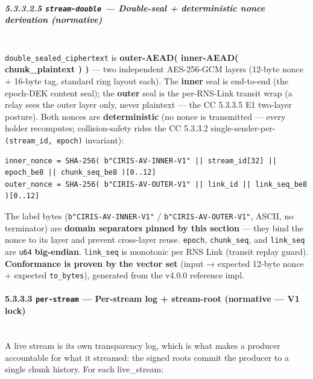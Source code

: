 \documentclass[11pt]{article}
\begin{document}
\subparagraph{5.3.3.2.5 \texttt{stream-double} — Double-seal + deterministic nonce derivation (normative)}\mbox{}\\


\texttt{double\_sealed\_ciphertext} is \textbf{outer-AEAD( inner-AEAD( chunk\_plaintext ) )} — two independent AES-256-GCM layers (12-byte nonce + 16-byte tag, standard ring layout each). The \textbf{inner} seal is end-to-end (the epoch-DEK content seal); the \textbf{outer} seal is the per-RNS-Link transit wrap (a relay sees the outer layer only, never plaintext — the CC 5.3.3.5 E1 two-layer posture). Both nonces are \textbf{deterministic} (no nonce is transmitted — every holder recomputes; collision-safety rides the CC 5.3.3.2 single-sender-per-\texttt{(stream\_id, epoch)} invariant):


\begin{lstlisting}
inner_nonce = SHA-256( b"CIRIS-AV-INNER-V1" || stream_id[32] || epoch_be8 || chunk_seq_be8 )[0..12]
outer_nonce = SHA-256( b"CIRIS-AV-OUTER-V1" || link_id || link_seq_be8 )[0..12]
\end{lstlisting}

The label bytes (\texttt{b"CIRIS-AV-INNER-V1"} / \texttt{b"CIRIS-AV-OUTER-V1"}, ASCII, no terminator) are \textbf{domain separators pinned by this section} — they bind the nonce to its layer and prevent cross-layer reuse. \texttt{epoch}, \texttt{chunk\_seq}, and \texttt{link\_seq} are \texttt{u64} \textbf{big-endian}. \texttt{link\_seq} is monotonic per RNS Link (transit replay guard). \textbf{Conformance is proven by the vector set} (input → expected 12-byte nonce + expected \texttt{to\_bytes}), generated from the v4.0.0 reference impl.


\paragraph{5.3.3.3 \texttt{per-stream} — Per-stream log + stream-root (normative — V1 lock)}\mbox{}\\


A live stream is its own transparency log, which is what makes a producer accountable for what it streamed: the signed roots commit the producer to a single chunk history. For each live\_stream:
\end{document}
